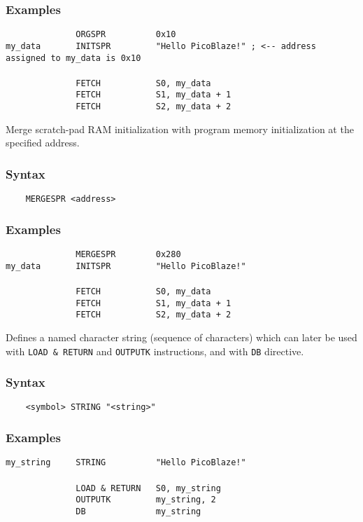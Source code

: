         \subsubsection{Examples}
            \verb'              ORGSPR          0x10'\\
            \verb'my_data       INITSPR         "Hello PicoBlaze!" ; <-- address assigned to my_data is 0x10'\\
            \verb''\\
            \verb'              FETCH           S0, my_data'\\
            \verb'              FETCH           S1, my_data + 1'\\
            \verb'              FETCH           S2, my_data + 2'

    \clearpage
        Merge scratch-pad RAM initialization with program memory initialization at the specified address.

        \subsubsection{Syntax}
            \verb'    MERGESPR <address>'

        \subsubsection{Examples}
            \verb'              MERGESPR        0x280'\\
            \verb'my_data       INITSPR         "Hello PicoBlaze!"'\\
            \verb''\\
            \verb'              FETCH           S0, my_data'\\
            \verb'              FETCH           S1, my_data + 1'\\
            \verb'              FETCH           S2, my_data + 2'

        Defines a named character string (sequence of characters) which can later be used with \texttt{LOAD \& RETURN} and \texttt{OUTPUTK} instructions, and with \texttt{DB} directive.

        \subsubsection{Syntax}
            \verb'    <symbol> STRING "<string>"'

        \subsubsection{Examples}
            \verb'my_string     STRING          "Hello PicoBlaze!"'\\
            \verb''\\
            \verb'              LOAD & RETURN   S0, my_string'\\
            \verb'              OUTPUTK         my_string, 2'\\
            \verb'              DB              my_string'

